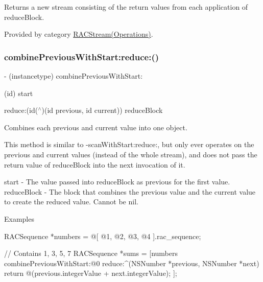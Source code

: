 Returns a new stream consisting of the return values from each application of {\ttfamily reduce\+Block}. 

Provided by category \mbox{\hyperlink{category_r_a_c_stream_07_operations_08_a698f6ef68be8d3cb34f9be6efaaa5af7}{R\+A\+C\+Stream(\+Operations)}}.

\mbox{\label{interface_r_a_c_stream_a698f6ef68be8d3cb34f9be6efaaa5af7}} 
\subsubsection{\texorpdfstring{combine\+Previous\+With\+Start\+:reduce\+:()}{combinePreviousWithStart:reduce:()}\hspace{0.1cm}{\footnotesize\ttfamily [2/3]}}
{\footnotesize\ttfamily -\/ (instancetype) combine\+Previous\+With\+Start\+: \begin{DoxyParamCaption}\item[{(id)}]{start }\item[{reduce:(id($^\wedge$)(id previous, id current))}]{reduce\+Block }\end{DoxyParamCaption}}

Combines each previous and current value into one object.

This method is similar to -\/scan\+With\+Start\+:reduce\+:, but only ever operates on the previous and current values (instead of the whole stream), and does not pass the return value of {\ttfamily reduce\+Block} into the next invocation of it.

start -\/ The value passed into {\ttfamily reduce\+Block} as {\ttfamily previous} for the first value. reduce\+Block -\/ The block that combines the previous value and the current value to create the reduced value. Cannot be nil.

Examples \begin{DoxyVerb} RACSequence *numbers = @[ @1, @2, @3, @4 ].rac_sequence;

 // Contains 1, 3, 5, 7
 RACSequence *sums = [numbers combinePreviousWithStart:@0 reduce:^(NSNumber *previous, NSNumber *next) {
     return @(previous.integerValue + next.integerValue);
 }];
\end{DoxyVerb}


